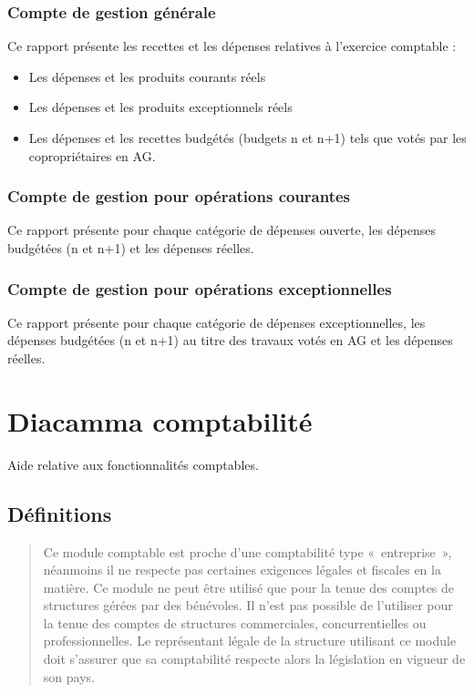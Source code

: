 \documentclass[a4paper,10pt,oneside,french]{sphinxmanual}
\begin{document}
\subsection{Compte de gestion générale}
\label{\detokenize{condominium/report:compte-de-gestion-generale}}
Ce rapport présente les recettes et les dépenses relatives à l’exercice comptable :
\begin{itemize}
\item {} 
Les dépenses et les produits courants réels

\item {} 
Les dépenses et les produits exceptionnels réels

\item {} 
Les dépenses et les recettes budgétés (budgets n et n+1) tels que votés par les copropriétaires en AG.

\end{itemize}


\subsection{Compte de gestion pour opérations courantes}
\label{\detokenize{condominium/report:compte-de-gestion-pour-operations-courantes}}
Ce rapport présente pour chaque catégorie de dépenses ouverte, les dépenses budgétées (n et n+1) et les dépenses
réelles.


\subsection{Compte de gestion pour opérations exceptionnelles}
\label{\detokenize{condominium/report:compte-de-gestion-pour-operations-exceptionnelles}}
Ce rapport présente pour chaque catégorie de dépenses exceptionnelles, les dépenses budgétées (n et n+1) au titre
des travaux votés en AG et les dépenses réelles.


\chapter{Diacamma comptabilité}
\label{\detokenize{accounting/index:diacamma-comptabilite}}\label{\detokenize{accounting/index::doc}}
Aide relative aux fonctionnalités comptables.


\section{Définitions}
\label{\detokenize{accounting/definition:definitions}}\label{\detokenize{accounting/definition::doc}}\begin{quote}

 Ce module comptable est proche d’une comptabilité type « entreprise », néanmoins il ne respecte pas certaines exigences légales et fiscales en la matière.
Ce module ne peut être utilisé que pour la tenue des comptes de structures gérées par des bénévoles. Il n’est pas possible de l’utiliser pour la tenue des comptes de structures commerciales, concurrentielles ou professionnelles.
Le représentant légale de la structure utilisant ce module doit s’assurer que sa comptabilité respecte alors la législation en vigueur de son pays.
\end{quote}
\end{document}
